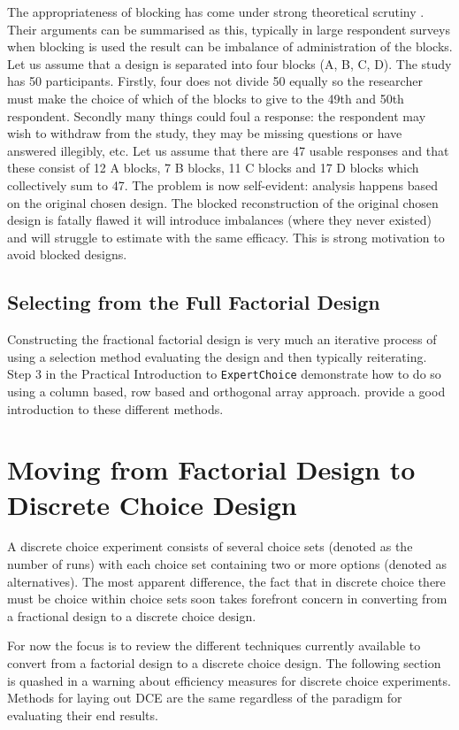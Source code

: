 \documentclass{article}
\begin{document}
The appropriateness of blocking has come under strong theoretical scrutiny \citep{hensherrosegreene2015, rose2009efficient-stated-choice}.
Their arguments can be summarised as this, typically in large respondent surveys when blocking is used the result can be imbalance of administration of the blocks.
Let us assume that a design is separated into four blocks (A, B, C, D). The study has 50 participants.
Firstly, four does not divide 50 equally so the researcher must make the choice of which of the blocks to give to the 49th and 50th respondent. Secondly many things could foul a response: the respondent may wish to withdraw from the study, they may be missing questions or have answered illegibly, etc.
Let us assume that there are 47 usable responses and that these consist of 12 A blocks, 7 B blocks, 11 C blocks and 17 D blocks which collectively sum to 47.
The problem is now self-evident: analysis happens based on the original chosen design.
The blocked reconstruction of the original chosen design is fatally flawed it will introduce imbalances (where they never existed) and will struggle to estimate with the same efficacy.
This is strong motivation to avoid blocked designs.


\subsection{Selecting from the Full Factorial Design}
Constructing the fractional factorial design is very much an iterative process of using a selection method evaluating the design and then typically reiterating.
Step 3 in the Practical Introduction to \texttt{ExpertChoice} demonstrate how to do so using a column based, row based and orthogonal array approach.
\citet{hensherrosegreene2015} provide a good introduction to these different methods.

\section{Moving from Factorial Design to Discrete Choice Design}
A discrete choice experiment consists of several choice sets (denoted as the number of runs) with each choice set containing two or more options (denoted as alternatives).
The most apparent difference, the fact that in discrete choice there must be choice within choice sets soon takes forefront concern in converting from a fractional design to a discrete choice design.

For now the focus is to review the different techniques currently available to convert from a factorial design to a discrete choice design.
The following section is quashed in a warning about efficiency measures for discrete choice experiments.
Methods for laying out DCE are the same regardless of the paradigm for evaluating their end results.
\end{document}
